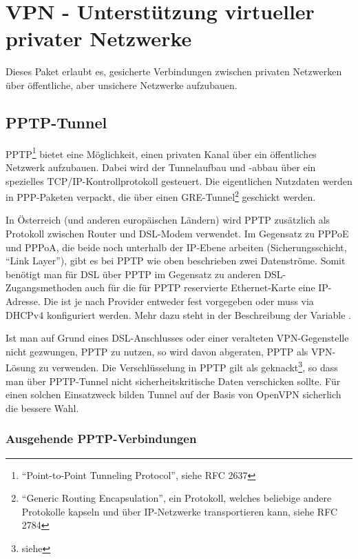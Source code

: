 \section{VPN - Unterstützung virtueller privater Netzwerke}

Dieses Paket erlaubt es, gesicherte Verbindungen zwischen privaten Netzwerken
über öffentliche, aber unsichere Netzwerke aufzubauen.

\subsection{PPTP-Tunnel}

PPTP\footnote{``Point-to-Point Tunneling Protocol'', siehe RFC 2637} bietet
eine Möglichkeit, einen privaten Kanal über ein öffentliches Netzwerk
aufzubauen. Dabei wird der Tunnelaufbau und -abbau über ein spezielles
TCP/IP-Kontrollprotokoll gesteuert. Die eigentlichen Nutzdaten werden in
PPP-Paketen verpackt, die über einen GRE-Tunnel\footnote{``Generic Routing
Encapsulation'', ein Protokoll, welches beliebige andere Protokolle kapseln und
über IP-Netzwerke transportieren kann, siehe RFC 2784} geschickt werden.

In Österreich (und anderen europäischen Ländern) wird PPTP zusätzlich als
Protokoll zwischen Router und DSL-Modem verwendet. Im Gegensatz zu PPPoE und
PPPoA, die beide noch unterhalb der IP-Ebene arbeiten (Sicherungsschicht,
``Link Layer''), gibt es bei PPTP wie oben beschrieben zwei Datenströme. Somit
benötigt man für DSL über PPTP im Gegensatz zu anderen DSL-Zugangsmethoden auch
für die für PPTP reservierte Ethernet-Karte eine IP-Adresse. Die ist je nach
Provider entweder fest vorgegeben oder muss via DHCPv4 konfiguriert werden.
Mehr dazu steht in der Beschreibung der Variable .

Ist man auf Grund eines DSL-Anschlusses oder einer veralteten VPN-Gegenstelle
nicht gezwungen, PPTP zu nutzen, so wird davon abgeraten, PPTP als VPN-Lösung
zu verwenden. Die Verschlüsselung in PPTP gilt als geknackt\footnote{siehe
}, so dass man über PPTP-Tunnel nicht
sicherheitskritische Daten verschicken sollte. Für einen solchen Einsatzweck
bilden Tunnel auf der Basis von OpenVPN sicherlich die bessere Wahl.

\subsubsection{Ausgehende PPTP-Verbindungen}


